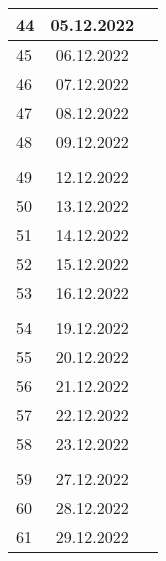 \begin{longtable}{|l|c|l|}
44  & 05.12.2022    &                                                       \\ \hline   
45  & 06.12.2022    &                                                       \\ \hline   
46  & 07.12.2022    &                                                       \\ \hline 
47  & 08.12.2022    &                                                       \\ \hline 
48  & 09.12.2022    &                                                       \\ \hline 
&               &                                                       \\ \hline 
49  & 12.12.2022    &                                                       \\ \hline 
50  & 13.12.2022    &                                                       \\ \hline 
51  & 14.12.2022    &                                                       \\ \hline 
52  & 15.12.2022    &                                                       \\ \hline 
53  & 16.12.2022    &                                                       \\ \hline 
&               &                                                       \\ \hline 
54  & 19.12.2022    &                                                       \\ \hline 
55  & 20.12.2022    &                                                       \\ \hline 
56  & 21.12.2022    &                                                       \\ \hline 
57  & 22.12.2022    &                                                       \\ \hline 
58  & 23.12.2022    &                                                       \\ \hline 
&               &                                                       \\ \hline 
59  & 27.12.2022    &                                                       \\ \hline 
60  & 28.12.2022    &                                                       \\ \hline 
61  & 29.12.2022    &                                                       \\ \hline 

\end{longtable}
